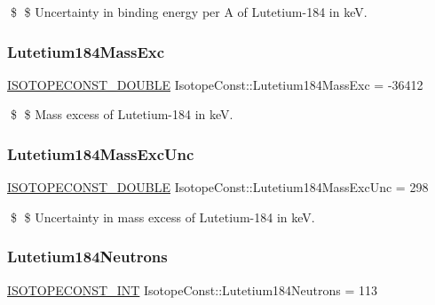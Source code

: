 \$ \$ Uncertainty in binding energy per A of Lutetium-\/184 in keV. \mbox{\label{group___isotope_const-_lutetium-_lu184_gaf3507aceece29f3a489b5d31af352617}} 
\subsubsection{\texorpdfstring{Lutetium184\+Mass\+Exc}{Lutetium184MassExc}}
{\footnotesize\ttfamily \mbox{\hyperlink{group___isotope_const-_macros_ga8f45a7272ce02c0b4c65c44636ed719a}{I\+S\+O\+T\+O\+P\+E\+C\+O\+N\+S\+T\+\_\+\+D\+O\+U\+B\+LE}} Isotope\+Const\+::\+Lutetium184\+Mass\+Exc = -\/36412}

\$ \$ Mass excess of Lutetium-\/184 in keV. \mbox{\label{group___isotope_const-_lutetium-_lu184_gaac34489bf65f3436e0d502e0ade11f4e}} 
\subsubsection{\texorpdfstring{Lutetium184\+Mass\+Exc\+Unc}{Lutetium184MassExcUnc}}
{\footnotesize\ttfamily \mbox{\hyperlink{group___isotope_const-_macros_ga8f45a7272ce02c0b4c65c44636ed719a}{I\+S\+O\+T\+O\+P\+E\+C\+O\+N\+S\+T\+\_\+\+D\+O\+U\+B\+LE}} Isotope\+Const\+::\+Lutetium184\+Mass\+Exc\+Unc = 298}

\$ \$ Uncertainty in mass excess of Lutetium-\/184 in keV. \mbox{\label{group___isotope_const-_lutetium-_lu184_gaf64b138cfb1e22ab711e43843796c369}} 
\subsubsection{\texorpdfstring{Lutetium184\+Neutrons}{Lutetium184Neutrons}}
{\footnotesize\ttfamily \mbox{\hyperlink{group___isotope_const-_macros_ga5f18360b3e99483a35c32d789e62621c}{I\+S\+O\+T\+O\+P\+E\+C\+O\+N\+S\+T\+\_\+\+I\+NT}} Isotope\+Const\+::\+Lutetium184\+Neutrons = 113}

